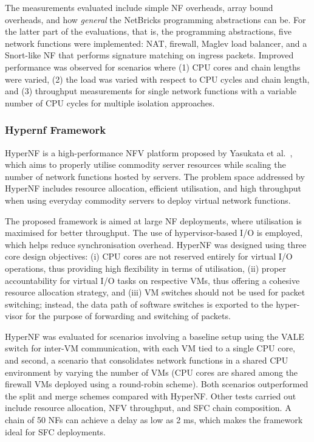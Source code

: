 \documentclass[futureinternet,review,accept,pdftex,moreauthors]{Definitions/mdpi}
\begin{document}
The measurements evaluated include simple NF overheads, array bound overheads, and how \textit{general} the NetBricks programming abstractions can be. For the latter part of the evaluations, that is, the programming abstractions, five network functions were implemented: NAT, firewall, Maglev load balancer, and a Snort-like NF that performs signature matching on ingress packets. Improved performance was observed for scenarios where (1) CPU cores and chain lengths were varied, (2) the load was varied with respect to CPU cycles and chain length, and (3) throughput measurements for single network functions with a variable number of CPU cycles for multiple isolation approaches.


\subsubsection{Hypernf Framework}
\label{HyperNF}
HyperNF is a high-performance NFV platform proposed by Yasukata {et al.}~\cite{yasukata2017hypernf}, which aims to properly  utilise commodity server resources while scaling the number of network functions hosted by servers. The problem space addressed by HyperNF includes resource allocation, efficient utilisation, and high throughput when using everyday commodity servers to deploy virtual network functions.

The proposed framework is aimed at large NF deployments, where utilisation is maximised for better throughput. The use of hypervisor-based I/O is employed, which helps reduce synchronisation overhead. HyperNF was designed using three core design objectives: (i) CPU cores are not reserved entirely for virtual I/O operations, thus providing high flexibility in terms of utilisation, (ii) proper accountability for virtual I/O tasks on respective VMs, thus offering a cohesive resource allocation strategy, and (iii) VM switches should not be used for packet switching; instead, the data path of software switches is exported to the hyper-visor for the purpose of forwarding and switching of packets.

HyperNF was evaluated for scenarios involving a baseline setup using the VALE~\cite{eisenbud2016maglev} switch for inter-VM communication, with each VM tied to a single CPU core, and second, a scenario that consolidates network functions in a shared CPU environment by varying the number of VMs (CPU cores are shared among the firewall VMs deployed using a round-robin scheme). Both scenarios outperformed the split and merge schemes compared with HyperNF. Other tests carried out include resource allocation, NFV throughput, and SFC chain composition. A chain of 50 NFs can achieve a delay as low as 2 ms, which makes the framework ideal for SFC deployments.
\end{document}
